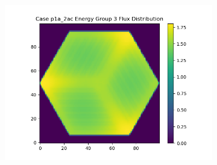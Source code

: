 \documentclass[letterpaper,11pt]{report}
\begin{document}
\begin{figure}[H]
\begin{subfigure}{.33\textwidth}
        \includegraphics[width=1.1\linewidth]{../../phase1a/case2ac/analysis_output/p1a_2ac_e_eg3.png}
        \caption{}
      \end{subfigure}
    \caption{}
    \label{fig:test}
    \end{figure}
\end{document}
